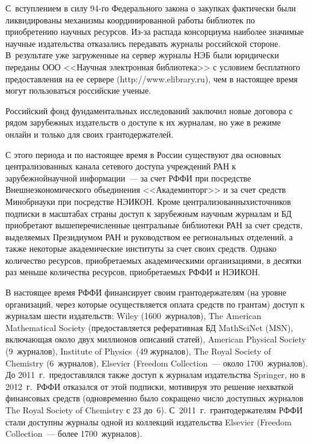 \begin{multicols}{2}
С~вступлением в силу 94-го 
Федерального закона о закупках фактически были ликвидированы 
механизмы координированной работы биб\-лио\-тек по приобретению научных 
ресурсов. Из-за распада консорциума наиболее значимые научные 
издательства отказались передавать журналы российской стороне. 
В~результате уже загруженные на сервер журналы НЭБ были юридически 
переданы ООО <<Научная электронная биб\-лио\-те\-ка>> с условием 
бесплатного предоставления на ее сервере ({\sf http://www.elibrary.ru}), чем в 
настоящее время могут пользоваться российские ученые.
     
     Российский фонд фундаментальных исследований заключил новые договора с рядом зарубежных издательств о 
доступе к их журналам, но уже в режиме онлайн и только для своих 
грантодержателей.
     
     С этого периода и по настоящее время в России существуют два 
основных централизованных канала сетевого доступа учреждений РАН к 
зарубежной\linebreak научной информации~--- за счет \mbox{РФФИ} при посредстве 
Внешнеэкономического
объединения <<Академинторг>> и за счет средств Мин\-обр\-на\-у\-ки при посредстве 
\mbox{НЭИКОН}. 
Кроме централизованных\linebreak источников подписки в масштабах страны доступ 
к зарубежным научным журналам и БД приобретают 
вышеперечисленные центральные биб\-лио\-те\-ки РАН за счет средств, 
выделяемых Президиумом РАН и руководством ее региональных отделений, 
а также некоторые академические институты за счет своих средств. Однако 
количество ресурсов, приобретаемых академическими организациями, в 
десятки раз меньше количества ресурсов, приобретаемых РФФИ и НЭИКОН. 
     
     В настоящее время РФФИ финансирует своим грантодержателям (на 
уровне организаций, через которые осуществляется оплата средств по 
грантам) доступ к журналам шести издательств: Wiley (1600~журналов), The 
American Mathematical Society (предоставляется реферативная БД MathSciNet
(MSN), включающая около двух миллионов описаний статей), American 
Physical Society (9~журналов), Institute of Physics~(49 журналов), The Royal 
Society of Chemistry (6~журналов), Elsevier (Freedom Collection~--- около 
1700~журналов). До 2011~г.\ предо\-став\-лял\-ся также доступ к журналам 
издательства Springer, но в 2012~г.\ \mbox{РФФИ} отказался от этой подписки, 
мотивируя это решение нехваткой финансовых средств (одновременно было 
сокращено число доступных журналов The Royal Society of Chemistry с 23 
до~6). С~2011~г.\ грантодержателям \mbox{РФФИ} стали доступны журналы одной 
из коллекций издательства Elsevier (Freedom Collection~--- более 
1700~журналов).
     

\end{multicols}
